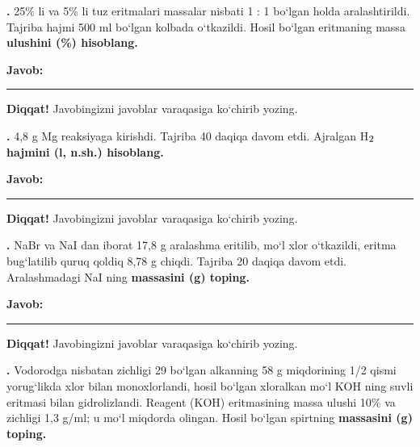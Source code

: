 \documentclass[11pt,a4paper]{article}
\renewcommand{\textsubscript}[1]{\ensuremath{_{\text{\fontsize{8}{8}\selectfont #1}}}}
\newcommand{\qn}[1]{\textbf{\fontsize{11.5}{13}\selectfont #1}}
\newcommand{\qsep}{\par\vspace{13pt}}
\newcommand{\javob}{\par\nopagebreak[4]\smallskip\noindent\textbf{Javob:} \rule[-2pt]{7.5cm}{0.4pt}\par\smallskip\noindent\textbf{Diqqat!} Javobingizni javoblar varaqasiga ko`chirib yozing.\par\medskip}
\begin{document}
\medskip
\noindent\setlength{\fboxsep}{0pt}
\par\bigskip
\noindent\qn{36.} 25\% li va 5\% li tuz eritmalari massalar nisbati 1 : 1 bo`lgan holda aralashtirildi. Tajriba hajmi 500 ml bo`lgan kolbada o`tkazildi. Hosil bo`lgan eritmaning massa \textbf{ulushini (\%) hisoblang.}
\javob\qsep
\noindent\qn{37.} 4,8 g Mg reaksiyaga kirishdi. Tajriba 40 daqiqa davom etdi. Ajralgan H\textsubscript{2} \textbf{hajmini (l, n.sh.) hisoblang.}
\javob\qsep
\noindent\qn{38.} NaBr va NaI dan iborat 17,8 g aralashma eritilib, mo`l xlor o`tkazildi, eritma bug`latilib quruq qoldiq 8,78 g chiqdi. Tajriba 20 daqiqa davom etdi. Aralashmadagi NaI ning \textbf{massasini (g) toping.}
\javob\qsep
\noindent\qn{39.} Vodorodga nisbatan zichligi 29 bo`lgan alkanning 58 g miqdorining 1/2 qismi yorug`likda xlor bilan monoxlorlandi, hosil bo`lgan xloralkan mo`l KOH ning suvli eritmasi bilan gidrolizlandi. Reagent (KOH) eritmasining massa ulushi 10\% va zichligi 1,3 g/ml; u mo`l miqdorda olingan. Hosil bo`lgan spirtning \textbf{massasini (g) toping.}
\end{document}
